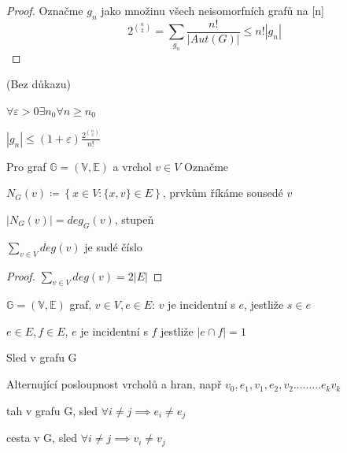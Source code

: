 \documentclass[../main.tex]{subfiles}
\begin{document}
\begin{proof}
    Označme $g_n$ jako množinu všech neisomorfních grafů na [n]
    \begin{equation*}
        2^{\binom{n}{2}} = \sum_{g_n} \frac{n!}{|Aut(G)|} \leq n! |g_n|
    \end{equation*}

\end{proof}

\begin{claim}
    (Bez důkazu)

    $\forall\varepsilon>0 \exists n_0 \forall n\geq n_0$

    $|g_n|\leq (1+\varepsilon) \frac{2^{\binom{n}{2}}}{n!}$
\end{claim}


\begin{definition}
    Pro graf $\mathbb{G} = (\mathbb{V}, \mathbb{E})$ a vrchol $v\in V$ Označme

    $N_G (v) \coloneq \left\{ x\in V: \{x, v\} \in E \right\}$, prvkům říkáme sousedé $v$ 

    $|N_G (v)| = deg_G(v)$, stupeň
\end{definition}


\begin{claim}
    $\sum_{v\in V} deg (v)$ je sudé číslo
\end{claim}
\begin{proof}
    $\sum_{v\in V} deg (v) = 2|E|$
\end{proof}

\begin{definition}
    $\mathbb{G} = (\mathbb{V}, \mathbb{E})$ graf, $v\in V, e\in E$: $v$ je incidentní s $e$, jestliže $s\in e$

    $e\in E, f\in E$, $e$ je incidentní s $f$ jestliže $|e\cap f| = 1$
\end{definition}


\begin{definition}
    Sled v grafu G

    Alternující posloupnost vrcholů a hran, např $v_0, e_1, v_1, e_2, v_2 ......... e_k v_k$ 
\end{definition}

\begin{definition}
    tah v grafu G, sled $\forall i\neq j \implies e_i \neq e_j$
\end{definition}

\begin{definition}
    cesta v G, sled $\forall i\neq j \implies v_i \neq v_j$

\end{definition}
\end{document}
